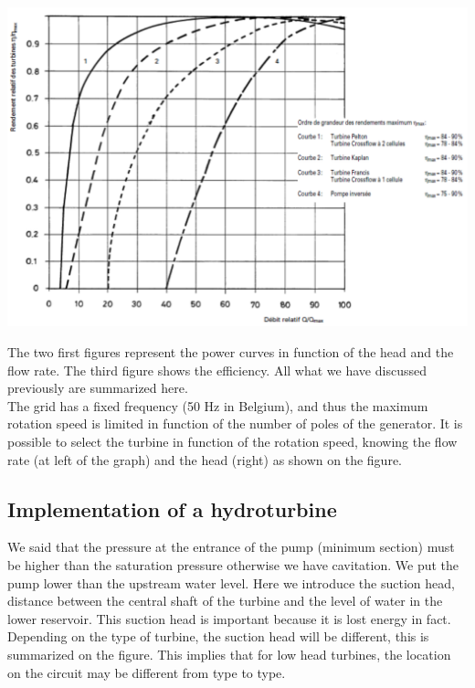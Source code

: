 \begin{center}
\begin{minipage}{0.3\textwidth}
\end{minipage}
\quad
\begin{minipage}{0.3\textwidth}
\begin{center}
\includegraphics[scale=0.22]{ch4/15}
\end{center}
\end{minipage}
\end{center}


The two first figures represent the power curves in function of the head and the flow rate. The third figure shows the efficiency. All what we have discussed previously are summarized here. 
\ \\

The grid has a fixed frequency (50 Hz in Belgium), and thus the maximum rotation speed is limited in function of the number of poles of the generator. It is possible to select the turbine in function of the rotation speed, knowing the flow rate (at left of the graph) and the head (right) as shown on the figure. 
\ \\

\subsection{Implementation of a hydroturbine}
We said that the pressure at the entrance of the pump (minimum section) must be higher than the saturation pressure otherwise we have cavitation. We put the pump lower than the upstream water level. Here we introduce the suction head, distance between the central shaft of the turbine and the level of water in the lower reservoir. This suction head is important because it is lost energy in fact. Depending on the type of turbine, the suction head will be different, this is summarized on the figure. This implies that for low head turbines, the location on the circuit may be different from type to type. 

